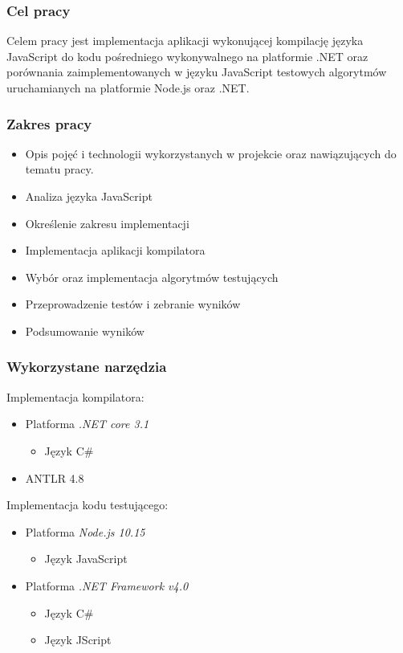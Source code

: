 
\begin{frame}
  \frametitle{Cel pracy}
	{Celem pracy jest implementacja aplikacji wykonującej kompilację języka JavaScript do kodu pośredniego wykonywalnego na platformie .NET oraz porównania zaimplementowanych w języku JavaScript testowych algorytmów uruchamianych na platformie Node.js oraz .NET.}
\end{frame}

\begin{frame}
  \frametitle{Zakres pracy}
  \begin{itemize}
    \item  Opis pojęć i technologii wykorzystanych w projekcie oraz nawiązujących do tematu pracy.
    \item  Analiza języka JavaScript
    \item  Określenie zakresu implementacji
    \item  Implementacja aplikacji kompilatora
    \item  Wybór oraz implementacja algorytmów testujących
    \item  Przeprowadzenie testów i zebranie wyników
    \item  Podsumowanie wyników
  \end{itemize}
\end{frame}

\begin{frame}
  \frametitle{Wykorzystane narzędzia}
  
  \begin{block}{Implementacja kompilatora:}
    \begin{itemize}
      \item  Platforma \textit{.NET core 3.1}
      \begin{itemize}
        \item  Język C\#
      \end{itemize}
      \item ANTLR 4.8
  \end{itemize}
  \end{block}

  \begin{block}{Implementacja kodu testującego:}
    \begin{itemize}
      \item  Platforma \textit{Node.js 10.15}
      \begin{itemize}
        \item  Język JavaScript
      \end{itemize}
      \item  Platforma \textit{.NET Framework v4.0}
      \begin{itemize}
        \item  Język C\#
        \item  Język JScript
      \end{itemize}
    \end{itemize}
  \end{block}
  
\end{frame}

